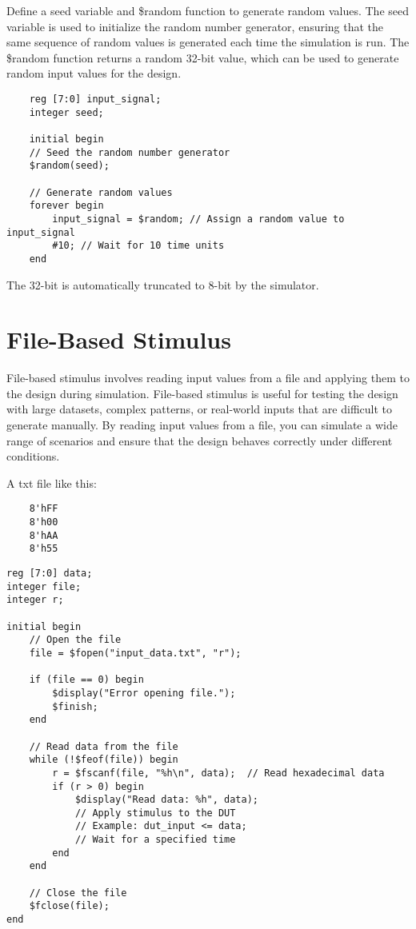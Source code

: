 \documentclass{report}
\begin{document}
Define a seed variable and \$random function to generate random values. The seed variable is used to initialize the random number generator, ensuring that the same sequence of random values is generated each time the simulation is run. The \$random function returns a random 32-bit value, which can be used to generate random input values for the design.
\begin{verbatim}
    reg [7:0] input_signal;
    integer seed;
    
    initial begin
    // Seed the random number generator
    $random(seed);
    
    // Generate random values
    forever begin
        input_signal = $random; // Assign a random value to input_signal
        #10; // Wait for 10 time units
    end
\end{verbatim}
The 32-bit is automatically truncated to 8-bit by the simulator.
\section{File-Based Stimulus}
File-based stimulus involves reading input values from a file and applying them to the design during simulation. File-based stimulus is useful for testing the design with large datasets, complex patterns, or real-world inputs that are difficult to generate manually. By reading input values from a file, you can simulate a wide range of scenarios and ensure that the design behaves correctly under different conditions.

A txt file like this:
\begin{verbatim}
    8'hFF
    8'h00
    8'hAA
    8'h55
\end{verbatim}
\begin{verbatim}
reg [7:0] data;
integer file;
integer r;

initial begin
    // Open the file
    file = $fopen("input_data.txt", "r");

    if (file == 0) begin
        $display("Error opening file.");
        $finish;
    end

    // Read data from the file
    while (!$feof(file)) begin
        r = $fscanf(file, "%h\n", data);  // Read hexadecimal data
        if (r > 0) begin
            $display("Read data: %h", data);
            // Apply stimulus to the DUT
            // Example: dut_input <= data;
            // Wait for a specified time
        end
    end

    // Close the file
    $fclose(file);
end
\end{verbatim}
\end{document}
